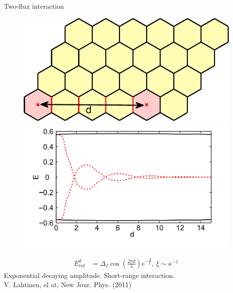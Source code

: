 \begin{frame}{Two-flux interaction}
    \begin{figure}
        \begin{minipage}[c]{.45\textwidth}
            \includegraphics[width = 1\textwidth]{figures/lattice_tor_2flux.pdf}
            \vspace{.8cm}
        \end{minipage}
        \begin{minipage}[c]{.45\textwidth}
            \includegraphics[width = 1\textwidth]{figures/interaction.png}
        \end{minipage}
    \end{figure}
    \begin{align*}
        E^d_{int} &= \Delta_f \cos\left(\frac{2\pi d}{\lambda}\right) e^{-\frac{d}{\xi}}, \ \xi \sim \kappa ^{-1}
    \end{align*}
    Exponential decaying amplitude. Short-range interaction.\\
    \footnotesize{V. Lahtinen, el at, New Jour. Phys. (2011)}
\end{frame}





